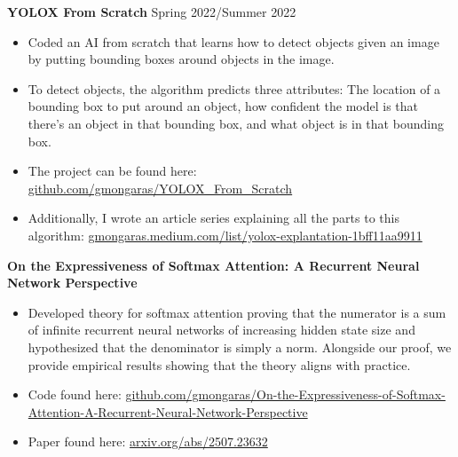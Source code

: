 \documentclass[a4paper,10pt]{article}
\begin{document}
\noindent\textbf{YOLOX From Scratch} \hfill Spring 2022/Summer 2022
\begin{itemize}[noitemsep,topsep=0pt]
  \item Coded an AI from scratch that learns how to detect objects given an image by putting bounding boxes around objects in the image.
  \item To detect objects, the algorithm predicts three attributes: The location of a bounding box to put around an object, how confident the model is that there’s an object in that bounding box, and what object is in that bounding box.
  \item  The project can be found here: \href{https://github.com/gmongaras/YOLOX_From_Scratch}{github.com/gmongaras/YOLOX\_From\_Scratch}
  \item  Additionally, I wrote an article series explaining all the parts to this algorithm:
\href{https://gmongaras.medium.com/list/yolox-explantation-1bff11aa9911}{gmongaras.medium.com/list/yolox-explantation-1bff11aa9911}
\end{itemize}






\vspace{5pt}
 \vspace{1pt}


\noindent\textbf{On the Expressiveness of Softmax Attention: A Recurrent Neural Network Perspective}
\begin{itemize}[noitemsep,topsep=0pt]
  \item Developed theory for softmax attention proving that the numerator is a sum of infinite recurrent neural networks of increasing hidden state size and hypothesized that the denominator is simply a norm. Alongside our proof, we provide empirical results showing that the theory aligns with practice.
  \item Code found here: \href{https://github.com/gmongaras/On-the-Expressiveness-of-Softmax-Attention-A-Recurrent-Neural-Network-Perspective}{github.com/gmongaras/On-the-Expressiveness-of-Softmax-Attention-A-Recurrent-Neural-Network-Perspective}
  \item Paper found here: \href{https://arxiv.org/abs/2507.23632}{arxiv.org/abs/2507.23632}
\end{itemize}
\end{document}
